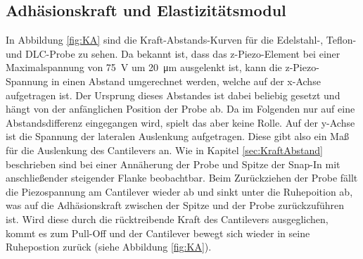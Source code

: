     \subsection{Adhäsionskraft und Elastizitätsmodul}
        In Abbildung \ref{fig:KA} sind die Kraft-Abstands-Kurven für die Edelstahl-, Teflon- und DLC-Probe zu sehen. Da bekannt ist, dass das z-Piezo-Element bei einer
        Maximalspannung von \SI{75}{\volt} um \SI{20}{\micro\metre} ausgelenkt ist, kann die z-Piezo-Spannung in einen Abstand umgerechnet werden, welche auf der x-Achse aufgetragen ist. Der Ursprung dieses Abstandes ist dabei beliebig gesetzt und hängt von der anfänglichen Position der Probe ab. Da im Folgenden nur auf eine Abstandsdifferenz eingegangen wird, spielt das aber keine Rolle. Auf der y-Achse ist die Spannung der lateralen Auslenkung aufgetragen. Diese gibt also ein Maß für die Auslenkung des Cantilevers an.
        Wie in Kapitel \ref{sec:KraftAbstand} beschrieben sind bei einer Annäherung der Probe und Spitze der Snap-In mit anschließender steigender Flanke beobachtbar. Beim Zurückziehen der Probe fällt die Piezospannung am Cantilever wieder ab und sinkt unter die Ruhepoition ab, was auf die Adhäsionskraft zwischen der Spitze und der Probe zurückzuführen ist. Wird diese durch die rücktreibende Kraft des Cantilevers ausgeglichen, kommt es zum Pull-Off und der Cantilever bewegt sich wieder in seine Ruhepostion zurück (siehe Abbildung \ref{fig:KA}).

